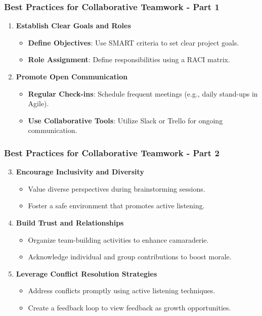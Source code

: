 \documentclass[aspectratio=169]{beamer}
\begin{document}
\begin{frame}[fragile]
    \frametitle{Best Practices for Collaborative Teamwork - Part 1}
    \begin{enumerate}
        \item \textbf{Establish Clear Goals and Roles}
            \begin{itemize}
                \item \textbf{Define Objectives}: Use SMART criteria to set clear project goals.
                \item \textbf{Role Assignment}: Define responsibilities using a RACI matrix.
            \end{itemize}
        \item \textbf{Promote Open Communication}
            \begin{itemize}
                \item \textbf{Regular Check-ins}: Schedule frequent meetings (e.g., daily stand-ups in Agile).
                \item \textbf{Use Collaborative Tools}: Utilize Slack or Trello for ongoing communication.
            \end{itemize}
    \end{enumerate}
\end{frame}

\begin{frame}[fragile]
    \frametitle{Best Practices for Collaborative Teamwork - Part 2}
    \begin{enumerate}
        \setcounter{enumi}{2} %
        \item \textbf{Encourage Inclusivity and Diversity}
            \begin{itemize}
                \item Value diverse perspectives during brainstorming sessions.
                \item Foster a safe environment that promotes active listening.
            \end{itemize}
        \item \textbf{Build Trust and Relationships}
            \begin{itemize}
                \item Organize team-building activities to enhance camaraderie.
                \item Acknowledge individual and group contributions to boost morale.
            \end{itemize}
        \item \textbf{Leverage Conflict Resolution Strategies}
            \begin{itemize}
                \item Address conflicts promptly using active listening techniques.
                \item Create a feedback loop to view feedback as growth opportunities.
            \end{itemize}
    \end{enumerate}
\end{frame}
\end{document}
